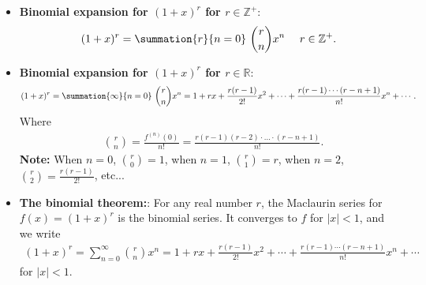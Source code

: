 \documentclass{report}
\begin{document}
\begin{itemize}
            \item \textbf{Binomial expansion for $(1+x)^{r}$ for $r\in\mathbb{Z^{+}}$}:
                \begin{align*}
                    (1+x)^{r}= \summation{r}{n=0}\ \binom{r}{n}x^{n}\ \quad r \in \mathbb{Z^{+}}
                .\end{align*}
            \item \textbf{Binomial expansion for $(1+x)^{r}$ for $r\in\mathbb{R}$}:
                \begin{align*}
                    (1+x)^{r} = \summation{\infty}{n=0}\ \binom{r}{n}x^{n} = 1+rx+ \frac{r(r-1)}{2!}x^2 + \cdots + \frac{r(r-1)\cdots(r-n+1)}{n!}x^n + \cdots
                .\end{align*}
                Where 
                \begin{align*}
            &\binom{r}{n} = \frac{f^{(n)}(0)}{n!} = \frac{r(r-1)(r-2)\cdot ...\cdot (r-n+1)}{n!} 
        .\end{align*}
        \textbf{Note:} When $n=0$, $\binom{r}{0} = 1$, when $n=1$, $\binom{r}{1} = r$, when $n=2$, $\binom{r}{2} = \frac{r(r-1)}{2!} $, etc...
    \item \textbf{The binomial theorem:}:
        For any real number \(r\), the Maclaurin series for \( f(x) = (1 + x)^r \) is the binomial series. It converges to \(f\) for \(|x| < 1\), and we write
        \begin{align*}
            (1 + x)^r = \sum_{n=0}^{\infty} \binom{r}{n} x^n = 1 + rx + \frac{r(r-1)}{2!}x^2 + \cdots + \frac{r(r-1) \cdots (r-n+1)}{n!}x^n + \cdots
        \end{align*}
        for \(|x| < 1\).
\end{itemize}


\pagebreak \bigbreak \noindent 
\end{document}
